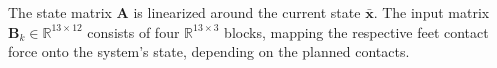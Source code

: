 The state matrix $\mathbf{A}$ is linearized around the current state $\bar{\mathbf{x}}$.
The input matrix $\mathbf{B}_{k} \in \mathbb{R}^{13\times12}$ consists of four $\mathbb{R}^{13\times3}$  blocks, mapping the respective feet contact force onto the system's state, depending on the planned contacts.
